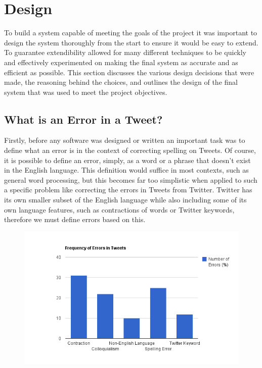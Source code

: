 \chapter{Design}

To build a system capable of meeting the goals of the project it was important to design the system thoroughly from the start to ensure it would be easy to extend. To guarantee extendibility allowed for many different techniques to be quickly and effectively experimented on making the final system as accurate and as efficient as possible. This section discusses the various design decisions that were made, the reasoning behind the choices, and outlines the design of the final system that was used to meet the project objectives.

\section{What is an Error in a Tweet?}
Firstly, before any software was designed or written an important task was to define what an error is in the context of correcting spelling on Tweets. Of course, it is possible to define an error, simply, as a word or a phrase that doesn't exist in the English language. This definition would suffice in most contexts, such as general word processing, but this becomes far too simplistic when applied to such a specific problem like correcting the errors in Tweets from Twitter. Twitter has its own smaller subset of the English language while also including some of its own language features, such as contractions of words or Twitter keywords, therefore we must define errors based on this.

\begin{figure}[!h]
	\centering
	\label{fig:errorchart}
	\includegraphics[scale=0.65]{images/errorfreqchart}
\end{figure}

